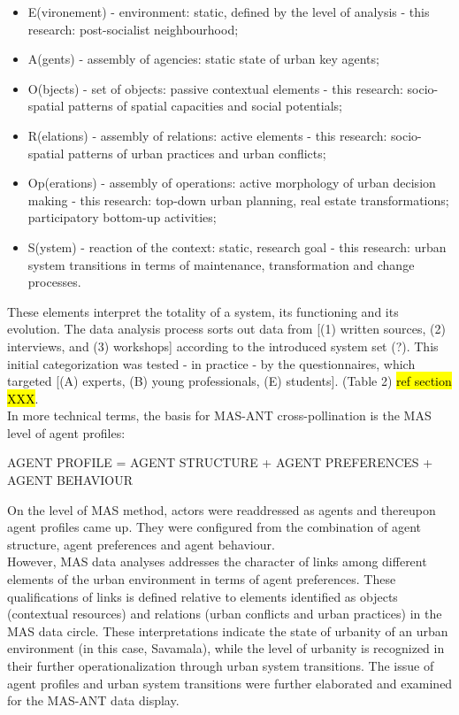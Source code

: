 \documentclass[11pt]{report}
\begin{document}
\begin{itemize}
\item E(vironement) - environment: static, defined by the level of analysis - this research: post-socialist neighbourhood;
\item A(gents) - assembly of agencies: static state of urban key agents;
\item O(bjects) - set of objects: passive contextual elements - this research: socio-spatial patterns of spatial capacities and social potentials;
\item R(elations) - assembly of relations: active elements - this research: socio-spatial patterns of urban practices and urban conflicts;
\item Op(erations) - assembly of operations: active morphology of urban decision making - this research: top-down urban planning, real estate transformations; participatory bottom-up activities;
\item S(ystem) - reaction of the context: static, research goal - this research:  urban system transitions in terms of maintenance, transformation and change processes.
\end{itemize}

These elements interpret the totality of a system, its functioning and its evolution.
The data analysis process sorts out data from [(1) written sources, (2) interviews, and (3) workshops] according to the introduced system set (?).
This initial categorization was tested - in practice - by the questionnaires, which targeted [(A) experts, (B) young professionals, (E) students].
 (Table 2) \hl{ref section XXX}.
\\
In more technical terms, the basis for MAS-ANT cross-pollination is the MAS level of agent profiles:

AGENT PROFILE = AGENT STRUCTURE + AGENT PREFERENCES + AGENT BEHAVIOUR

On the level of MAS method, actors were readdressed as agents and thereupon agent profiles came up. They were configured from the combination of agent structure, agent preferences and agent behaviour.
\\
However, MAS data analyses addresses the character of links among different elements of the urban environment in terms of agent preferences. These qualifications of links is defined relative to elements identified as objects (contextual resources) and relations (urban conflicts and urban practices) in the MAS data circle. These interpretations indicate the state of urbanity of an urban environment (in this case, Savamala), while the level of urbanity is recognized in their further operationalization through urban system transitions.
The issue of agent profiles and urban system transitions were further elaborated and examined for the MAS-ANT data display.
\end{document}
